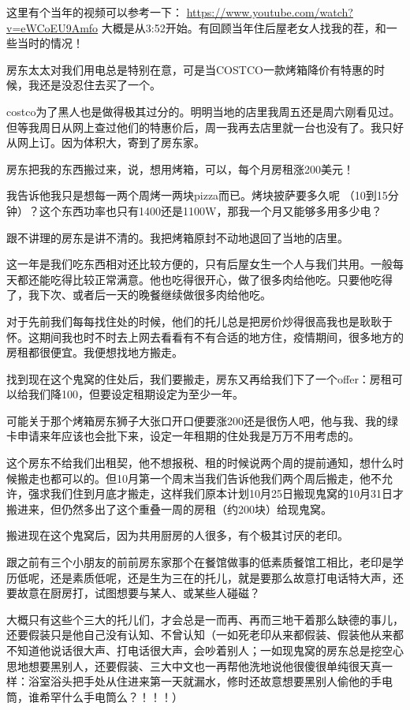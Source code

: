 \documentclass[9pt, b5paper]{article}
\begin{document}
这里有个当年的视频可以参考一下： \url{https://www.youtube.com/watch?v=eWCoEU9Amfo} 大概是从3:52开始。有回顾当年住后屋老女人找我的茬，和一些当时的情况！

房东太太对我们用电总是特别在意，可是当COSTCO一款烤箱降价有特惠的时候，我还是没忍住去买了一个。

costco为了黑人也是做得极其过分的。明明当地的店里我周五还是周六刚看见过。但等我周日从网上查过他们的特惠价后，周一我再去店里就一台也没有了。我只好从网上订。因为体积大，寄到了房东家。 

房东把我的东西搬过来，说，想用烤箱，可以，每个月房租涨200美元！

我告诉他我只是想每一两个周烤一两块pizza而已。烤块披萨要多久呢 （10到15分钟）？这个东西功率也只有1400还是1100W，那我一个月又能够多用多少电？

跟不讲理的房东是讲不清的。我把烤箱原封不动地退回了当地的店里。 

这一年是我们吃东西相对还比较方便的，只有后屋女生一个人与我们共用。一般每天都还能吃得比较正常满意。他也吃得很开心，做了很多肉给他吃。只要他吃得了，我下次、或者后一天的晚餐继续做很多肉给他吃。 

对于先前我们每每找住处的时候，他们的托儿总是把房价炒得很高我也是耿耿于怀。这期间我也时不时去上网去看看有不有合适的地方住，疫情期间，很多地方的房租都很便宜。我便想找地方搬走。 

找到现在这个鬼窝的住处后，我们要搬走，房东又再给我们下了一个offer：房租可以给我们降100，但要设定租期设定为至少一年。

可能关于那个烤箱房东狮子大张口开口便要涨200还是很伤人吧，他与我、我的绿卡申请来年应该也会批下来，设定一年租期的住处我是万万不用考虑的。 

这个房东不给我们出租契，他不想报税、租的时候说两个周的提前通知，想什么时候搬走也都可以的。但10月第一个周末当我们告诉他我们两个周后搬走，他不允许，强求我们住到月底才搬走，这样我们原本计划10月25日搬现鬼窝的10月31日才搬进来，但仍然多出了这个重叠一周的房租（约200块）给现鬼窝。


搬进现在这个鬼窝后，因为共用厨房的人很多，有个极其讨厌的老印。

跟之前有三个小朋友的前前房东家那个在餐馆做事的低素质餐馆工相比，老印是学历低呢，还是素质低呢，还是生为三在的托儿，就是要那么故意打电话特大声，还要故意在厨房打，试图想要与某人、或某些人碰磁？

大概只有这些个三大的托儿们，才会总是一而再、再而三地干着那么缺德的事儿，还要假装只是他自己没有认知、不曾认知（一如死老印从来都假装、假装他从来都不知道他说话很大声、打电话很大声，会吵着别人；一如现鬼窝的房东总是挖空心思地想要黑别人，还要假装、三大中文也一再帮他洗地说他很傻很单纯很天真一样：浴室浴头把手处从住进来第一天就漏水，修时还故意想要黑别人偷他的手电筒，谁希罕什么手电筒么？！！！）
\end{document}
